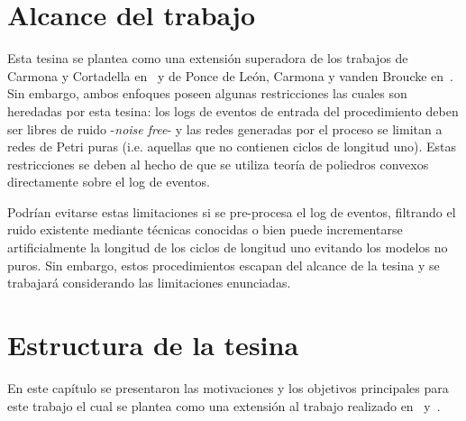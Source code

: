 
\section{Alcance del trabajo}
\label{sec:alcance}

Esta tesina se plantea como una extensión superadora de los trabajos de Carmona y Cortadella en~\cite{CarmonaC14}
y de Ponce de León, Carmona y vanden Broucke en~\cite{LeonCB15}. 
Sin embargo, ambos enfoques poseen algunas restricciones las cuales son heredadas por esta tesina:
los logs de eventos de entrada del procedimiento deben ser libres de ruido -\textit{noise free}- y las redes generadas
por el proceso se limitan a redes de Petri puras (i.e. aquellas que no contienen ciclos de longitud uno).
Estas restricciones se deben al hecho de que se utiliza teoría de poliedros convexos directamente sobre el log de eventos.

Podrían evitarse estas limitaciones si se  pre-procesa el log de eventos, filtrando el ruido existente mediante
técnicas conocidas o bien puede incrementarse artificialmente la longitud de los ciclos de longitud uno evitando los modelos 
no puros. Sin embargo, estos procedimientos escapan del alcance de la tesina y se trabajará considerando las limitaciones
enunciadas.

\section{Estructura de la tesina}
\label{sec:estructura}

En este capítulo se presentaron las motivaciones y los objetivos principales para este trabajo el cual se
plantea como una extensión al trabajo realizado en~\cite{CarmonaC14} y~\cite{LeonCB15}.


